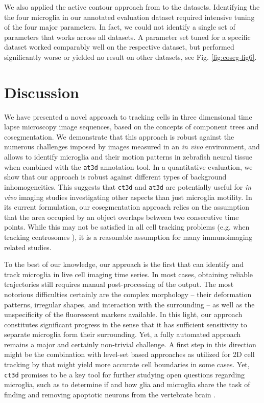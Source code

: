 We also applied the active contour approach from \cite{chan2001active} to
the datasets. Identifying the the four microglia in our annotated
evaluation dataset required intensive tuning of the four major
parameters. In fact, we could not identify a single set
  of parameters that works across all datasets. A parameter set tuned
  for a specific dataset worked comparably well on the respective
  dataset, but performed significantly worse or yielded no result on
  other datasets, see Fig. \ref{fig:coseg-fig6}.

\section{Discussion}

We have presented a novel approach to tracking cells in three
dimensional time lapse microscopy image sequences, based on the
concepts of component trees and cosegmentation. We demonstrate that
this approach is robust against the numerous challenges imposed by
images measured in an \textit{in vivo} environment, and allows to
identify microglia and their motion patterns in zebrafish neural
tissue when combined with the \texttt{at3d} annotation tool. In a
quantitative evaluation, we show that our approach is robust against
different types of background inhomogeneities. This suggests that
\texttt{ct3d} and \texttt{at3d} are potentially useful for \textit{in
  vivo} imaging studies investigating other aspects than just
microglia motility. In its current formulation, our cosegmentation
approach relies on the assumption that the area occupied by an object
overlaps between two consecutive time points. While this may not be
satisfied in all cell tracking problems (e.g. when tracking
centrosomes \cite{Jaensch:10}), it is a reasonable assumption for
many immunoimaging related studies.

To the best of our knowledge, our approach is the first that can
identify and track microglia in live cell imaging time series. In most
cases, obtaining reliable trajectories still requires manual
post-processing of the output. The most notorious difficulties
certainly are the complex morphology -- their deformation patterns,
irregular shapes, and interaction with the surrounding -- as well as
the unspecificity of the fluorescent markers available. In this light,
our approach constitutes significant progress in the sense that it has
sufficient sensitivity to separate microglia form their
surrounding. Yet, a fully automated approach remains a major and
certainly non-trivial challenge. A first step in this direction might
be the combination with level-set based approaches as utilized for 2D
cell tracking by \cite{Nath:06} that might yield more accurate cell
boundaries in some cases. Yet, \texttt{ct3d} promises to be a key tool
for further studying open questions regarding microglia, such as to
determine if and how glia and microglia share the task of finding and
removing apoptotic neurons from the vertebrate brain \cite{Peri:08}. 

